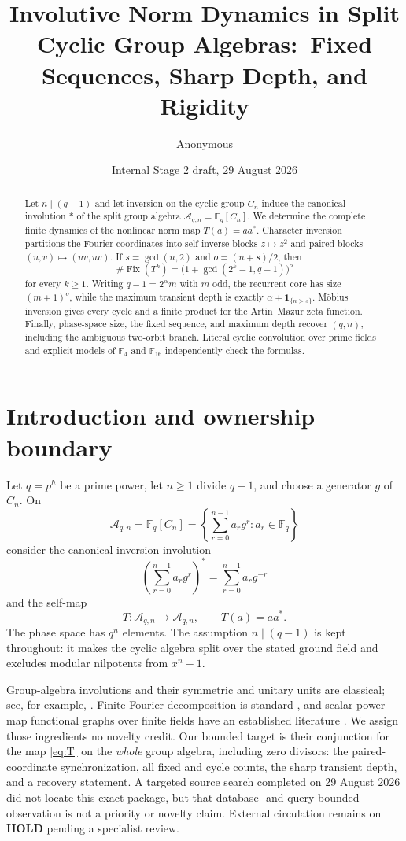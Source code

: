 \documentclass[11pt,a4paper]{amsart}
\title[Involutive norms in cyclic group algebras]{Involutive Norm Dynamics in Split Cyclic Group Algebras:\ Fixed Sequences, Sharp Depth, and Rigidity}
\author{Anonymous}
\date{Internal Stage 2 draft, 29 August 2026}
\newcommand{\F}{\mathbb F}
\newcommand{\A}{\mathcal A}
\newcommand{\Fix}{\operatorname{Fix}}
\begin{document}
\begin{abstract}
Let $n\mid(q-1)$ and let inversion on the cyclic group $C_n$ induce the
canonical involution $*$ of the split group algebra
$\A_{q,n}=\F_q[C_n]$.  We determine the complete finite dynamics of the
nonlinear norm map $T(a)=aa^*$.  Character inversion partitions the Fourier
coordinates into self-inverse blocks $z\mapsto z^2$ and paired blocks
$(u,v)\mapsto(uv,uv)$.  If $s=\gcd(n,2)$ and $o=(n+s)/2$, then
\[
 \#\Fix(T^k)=\bigl(1+\gcd(2^k-1,q-1)\bigr)^o
\]
for every $k\geq1$.  Writing $q-1=2^\alpha m$ with $m$ odd, the recurrent
core has size $(m+1)^o$, while the maximum transient depth is exactly
$\alpha+\mathbf1_{\{n>s\}}$.  M\"obius inversion gives every cycle and a
finite product for the Artin--Mazur zeta function.  Finally, phase-space
size, the fixed sequence, and maximum depth recover $(q,n)$, including the
ambiguous two-orbit branch.  Literal cyclic convolution over prime fields
and explicit models of $\F_4$ and $\F_{16}$ independently check the formulas.
\end{abstract}

\maketitle

\section{Introduction and ownership boundary}

Let $q=p^h$ be a prime power, let $n\geq1$ divide $q-1$, and choose a
generator $g$ of $C_n$.  On
\[
 \A_{q,n}=\F_q[C_n]
   =\left\{\sum_{r=0}^{n-1}a_rg^r:a_r\in\F_q\right\}
\]
consider the canonical inversion involution
\[
 \left(\sum_{r=0}^{n-1}a_rg^r\right)^*
   =\sum_{r=0}^{n-1}a_rg^{-r}
\]
and the self-map
\begin{equation}
 \label{eq:T}
 T\colon\A_{q,n}\longrightarrow\A_{q,n},\qquad T(a)=aa^*.
\end{equation}
The phase space has $q^n$ elements.  The assumption $n\mid(q-1)$ is kept
throughout: it makes the cyclic algebra split over the stated ground field
and excludes modular nilpotents from $x^n-1$.

Group-algebra involutions and their symmetric and unitary units are classical;
see, for example, \citet{BovdiGrishkov2019}.  Finite Fourier decomposition is
standard \citep{Terras1999}, and scalar power-map functional graphs over
finite fields have an established literature
\citep{VasigaShallit2004,QureshiReis2023}.  We assign those ingredients no
novelty credit.  Our bounded target is their conjunction for the map
\eqref{eq:T} on the \emph{whole} group algebra, including zero divisors:
the paired-coordinate synchronization, all fixed and cycle counts, the
sharp transient depth, and a recovery statement.  A targeted source search
completed on 29 August 2026 did not locate this exact package, but that
database- and query-bounded observation is not a priority or novelty claim.
External circulation remains on \textbf{HOLD} pending a specialist review.
\end{document}
